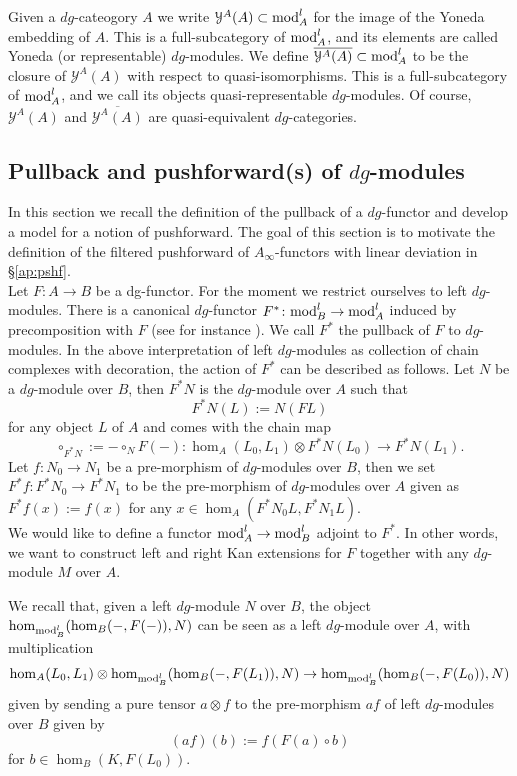 Given a $dg$-cateogory $A$ we write $\mathcal{Y}^A(A)\subset\text{mod}^l_A$ for the image of the Yoneda embedding of $A$. This is a full-subcategory of $\text{mod}^l_A$, and its elements are called Yoneda (or representable) $dg$-modules. We define $\overline{\mathcal{Y}^A(A)}\subset \text{mod}^l_A$ to be the closure of $\mathcal{Y}^A(A)$ with respect to quasi-isomorphisms. This is a full-subcategory of $\text{mod}^l_A$, and we call its objects quasi-representable $dg$-modules. Of course, $\mathcal{Y}^A(A)$ and $\overline{\mathcal{Y}^A(A)}$ are quasi-equivalent $dg$-categories.


\subsection{Pullback and pushforward(s) of $dg$-modules}\label{dgpullpush}
In this section we recall the definition of the pullback of a $dg$-functor and develop a model for a notion of pushforward. The goal of this section is to motivate the definition of the filtered pushforward of $A_\infty$-functors with linear deviation in \S\ref{ap:pshf}.\\

Let $F\colon A\to B$ be a dg-functor. For the moment we restrict ourselves to left $dg$-modules. There is a canonical $dg$-functor $F^*\colon \text{mod}^l_B\to \text{mod}^l_A$ induced by precomposition with $F$ (see for instance \cite{Se:book-fukaya-categ}). We call $F^*$ the pullback of $F$ to $dg$-modules. In the above interpretation of left $dg$-modules as collection of chain complexes with decoration, the action of $F^*$ can be described as follows. Let $N$ be a $dg$-module over $B$, then $F^*N$ is the $dg$-module over $A$ such that $$F^*N(L):=N(FL)$$ for any object $L$ of $A$ and comes with the chain map $$\circ_{F^*N}:=-\circ_NF(-)\colon  \hom_A(L_0,L_1)\otimes F^*N(L_0)\to F^*N(L_1).$$ Let $f\colon N_0\to N_1$ be a pre-morphism of $dg$-modules over $B$, then we set $F^*f\colon F^*N_0\to F^*N_1$ to be the pre-morphism of $dg$-modules over $A$ given as $F^*f(x):=f(x)$ for any $x\in \hom_A(F^*N_0L, F^*N_1L)$.\\

We would like to define a functor $\text{mod}^l_A\to \text{mod}^l_B$ adjoint to $F^*$. In other words, we want to construct left and right Kan extensions for $F$ together with any $dg$-module $M$ over $A$.

We recall that, given a left $dg$-module $N$ over $B$, the object $\hom_{\text{mod}^l_B}(\hom_B(-,F(-)), N)$ can be seen as a left $dg$-module over $A$, with multiplication $$\hom_A(L_0,L_1)\otimes \hom_{\text{mod}^l_B}(\hom_B(-,F(L_1)), N) \to \hom_{\text{mod}^l_B}(\hom_B(-,F(L_0)), N)$$ given by sending a pure tensor $a\otimes f$ to the pre-morphism $af$ of left $dg$-modules over $B$ given by $$(af)(b) := f(F(a)\circ b)$$ for $b\in \hom_B(K,F(L_0))$.

